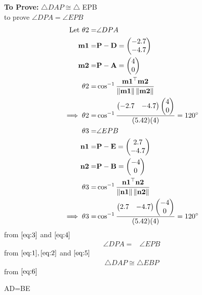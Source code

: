 \documentclass[10pt]{article}
\newcommand{\myvec}[1]{\ensuremath{\begin{pmatrix}#1\end{pmatrix}}}
\providecommand{\norm}[1]{\left\lVert#1\right\rVert}
\let\vec\mathbf{}
\begin{document}
\textbf{To Prove:}  $\triangle DAP \cong \triangle$ EPB\\
to prove $\angle {DPA}=\angle {EPB}$
\begin{align}
\text{ Let  }\theta2=&\angle DPA\\
\vec{m1}=&\vec{P}-\vec{D}=\myvec{-2.7\\-4.7}\\
\vec{m2}=&\vec{P}-\vec{A}=\myvec{4\\0}\\
\theta2=&\cos^{-1}\frac{\vec{m1}^\top\vec{m2}}{\norm{\vec{m1}}\norm{\vec{m2}}}\\
\implies\theta2=&\cos^{-1}\frac{\myvec{-2.7&-4.7}\myvec{4\\0}}{(5.42)(4)}=120\degree
\label{eq:3}\\
\theta3=&\angle EPB\\
\vec{n1}=&\vec{P}-\vec{E}=\myvec{2.7\\-4.7}\\
\vec{n2}=&\vec{P}-\vec{B}=\myvec{-4\\0}\\
\theta3 =& \cos^{-1}\frac{\vec{n1}^\top\vec{n2}}{\norm{\vec{n1}}\norm{\vec{n2}}}\\
\implies\theta3=&\cos^{-1}\frac{\myvec{2.7&-4.7}\myvec{-4\\0}}{(5.42)(4)}=120\degree
\label{eq:4}
\end{align}
from $\eqref{eq:3}$ and $\eqref{eq:4}$
\begin{align}
\angle {DPA}=&\angle {EPB}
\label{eq:5}
\end{align}
from $\eqref{eq:1},\eqref{eq:2}$ and $\eqref{eq:5}$\\
\begin{align}
\triangle DAP \cong \triangle EBP
\label{eq:6}
\end{align}
from $\eqref{eq:6}$\\
\begin{center}
AD=BE
\end{center}
\end{document}

